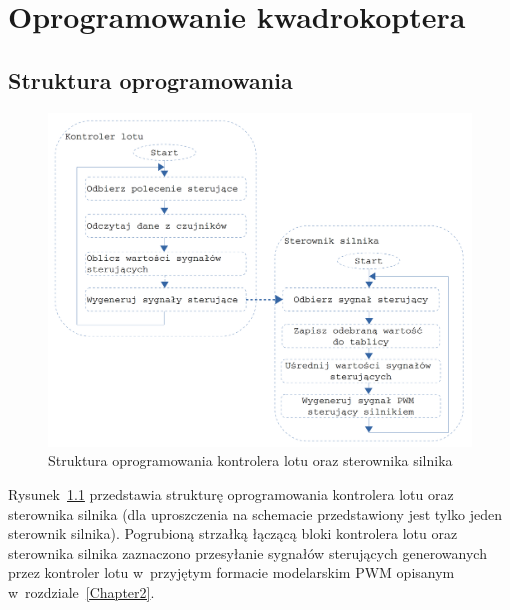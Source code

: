 
\chapter{Oprogramowanie kwadrokoptera} %

\label{Chapter6} %


\section{Struktura oprogramowania}

\begin{figure}[H]
	\centering
	\includegraphics[width=1\textwidth]{Pictures/Struktura_oprogramowania.png}
		\caption[Struktura oprogramowania kontrolera lotu oraz sterownika silnika]{Struktura oprogramowania kontrolera lotu oraz sterownika silnika}
	\label{fig:struktura_oprogramowania}
\end{figure}

Rysunek~\ref{fig:struktura_oprogramowania} przedstawia strukturę oprogramowania kontrolera lotu oraz sterownika silnika (dla uproszczenia na schemacie przedstawiony jest tylko jeden sterownik silnika). Pogrubioną strzałką łączącą bloki kontrolera lotu oraz sterownika silnika zaznaczono przesyłanie sygnałów sterujących generowanych przez kontroler lotu w~przyjętym formacie modelarskim PWM opisanym w~rozdziale~\ref{Chapter2}.

